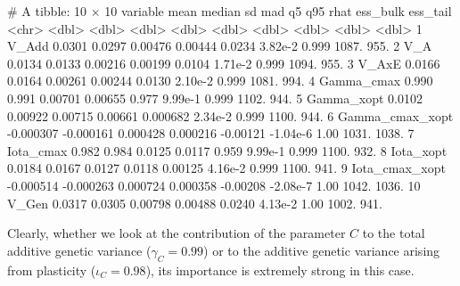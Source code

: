 \documentclass[a4paper,12pt,twoside]{article}
\begin{document}
\begin{Routput}
# A tibble: 10 × 10
   variable             mean    median       sd      mad        q5       q95  rhat ess_bulk ess_tail
   <chr>               <dbl>     <dbl>    <dbl>    <dbl>     <dbl>     <dbl> <dbl>    <dbl>    <dbl>
 1 V_Add            0.0301    0.0297   0.00476  0.00444   0.0234     3.82e-2 0.999    1087.     955.
 2 V_A              0.0134    0.0133   0.00216  0.00199   0.0104     1.71e-2 0.999    1094.     955.
 3 V_AxE            0.0166    0.0164   0.00261  0.00244   0.0130     2.10e-2 0.999    1081.     994.
 4 Gamma_cmax       0.990     0.991    0.00701  0.00655   0.977      9.99e-1 0.999    1102.     944.
 5 Gamma_xopt       0.0102    0.00922  0.00715  0.00661   0.000682   2.34e-2 0.999    1100.     944.
 6 Gamma_cmax_xopt -0.000307 -0.000161 0.000428 0.000216 -0.00121   -1.04e-6 1.00     1031.    1038.
 7 Iota_cmax        0.982     0.984    0.0125   0.0117    0.959      9.99e-1 0.999    1100.     932.
 8 Iota_xopt        0.0184    0.0167   0.0127   0.0118    0.00125    4.16e-2 0.999    1100.     941.
 9 Iota_cmax_xopt  -0.000514 -0.000263 0.000724 0.000358 -0.00208   -2.08e-7 1.00     1042.    1036.
10 V_Gen            0.0317    0.0305   0.00798  0.00488   0.0240     4.13e-2 1.00     1002.     941.
\end{Routput}
Clearly, whether we look at the contribution of the parameter $C$ to the total additive genetic variance ($\gamma_{C}=0.99$) or to the additive genetic variance arising from plasticity ($\iota_{C}=0.98$), its importance is extremely strong in this case.
\end{document}
